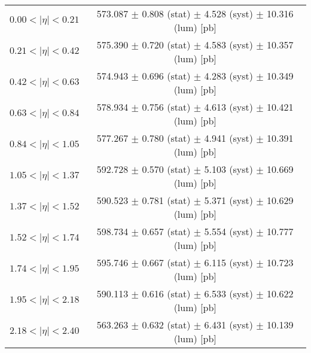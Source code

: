\begin{tabular}{lc}
\hline
$0.00 < |\eta| <0.21$          & 573.087 $\pm$ 0.808 (stat) $\pm$ 4.528 (syst) $\pm$ 10.316 (lum) [pb]  \\
$0.21 < |\eta| <0.42$          & 575.390 $\pm$ 0.720 (stat) $\pm$ 4.583 (syst) $\pm$ 10.357 (lum) [pb]  \\
$0.42 < |\eta| <0.63$          & 574.943 $\pm$ 0.696 (stat) $\pm$ 4.283 (syst) $\pm$ 10.349 (lum) [pb]  \\
$0.63 < |\eta| <0.84$          & 578.934 $\pm$ 0.756 (stat) $\pm$ 4.613 (syst) $\pm$ 10.421 (lum) [pb]  \\
$0.84 < |\eta| <1.05$          & 577.267 $\pm$ 0.780 (stat) $\pm$ 4.941 (syst) $\pm$ 10.391 (lum) [pb]  \\
$1.05 < |\eta| <1.37$          & 592.728 $\pm$ 0.570 (stat) $\pm$ 5.103 (syst) $\pm$ 10.669 (lum) [pb]  \\
$1.37 < |\eta| <1.52$          & 590.523 $\pm$ 0.781 (stat) $\pm$ 5.371 (syst) $\pm$ 10.629 (lum) [pb]  \\
$1.52 < |\eta| <1.74$          & 598.734 $\pm$ 0.657 (stat) $\pm$ 5.554 (syst) $\pm$ 10.777 (lum) [pb]  \\
$1.74 < |\eta| <1.95$          & 595.746 $\pm$ 0.667 (stat) $\pm$ 6.115 (syst) $\pm$ 10.723 (lum) [pb]  \\
$1.95 < |\eta| <2.18$          & 590.113 $\pm$ 0.616 (stat) $\pm$ 6.533 (syst) $\pm$ 10.622 (lum) [pb]  \\
$2.18 < |\eta| <2.40$          & 563.263 $\pm$ 0.632 (stat) $\pm$ 6.431 (syst) $\pm$ 10.139 (lum) [pb]  \\
\hline
\end{tabular}
